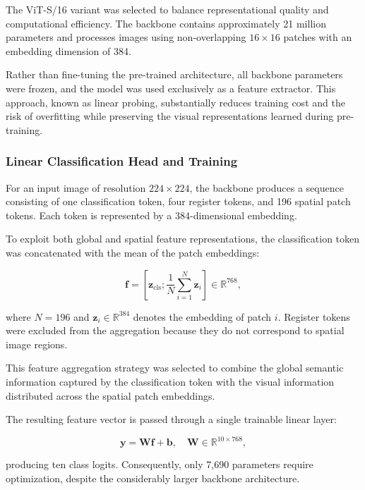 \documentclass[conference]{IEEEtran}
\begin{document}
The ViT-S/16 variant was selected to balance
representational quality and computational efficiency.
The backbone contains approximately 21 million parameters
and processes images using non-overlapping $16 \times 16$
patches with an embedding dimension of 384.

Rather than fine-tuning the pre-trained architecture,
all backbone parameters were frozen, and the model was
used exclusively as a feature extractor. This approach,
known as linear probing, substantially reduces training
cost and the risk of overfitting while preserving the
visual representations learned during pre-training.

\subsubsection{Linear Classification Head and Training}

For an input image of resolution $224 \times 224$,
the backbone produces a sequence consisting of one
classification token, four register tokens, and 196
spatial patch tokens. Each token is represented by a
384-dimensional embedding.

To exploit both global and spatial feature representations,
the classification token was concatenated with the mean
of the patch embeddings:

\begin{equation}
    \mathbf{f} =
    \left[
        \mathbf{z}_{\mathrm{cls}};
        \frac{1}{N}\sum_{i=1}^{N}\mathbf{z}_i
    \right]
    \in \mathbb{R}^{768},
\end{equation}

where $N=196$ and $\mathbf{z}_i \in \mathbb{R}^{384}$
denotes the embedding of patch $i$. Register tokens
were excluded from the aggregation because they do not
correspond to spatial image regions.

This feature aggregation strategy was selected to
combine the global semantic information captured by
the classification token with the visual information
distributed across the spatial patch embeddings.

The resulting feature vector is passed through a single
trainable linear layer:

\begin{equation}
    \mathbf{y} = \mathbf{W}\mathbf{f} + \mathbf{b},
    \quad
    \mathbf{W} \in \mathbb{R}^{10 \times 768},
\end{equation}

producing ten class logits. Consequently, only 7,690
parameters require optimization, despite the considerably
larger backbone architecture.
\end{document}
